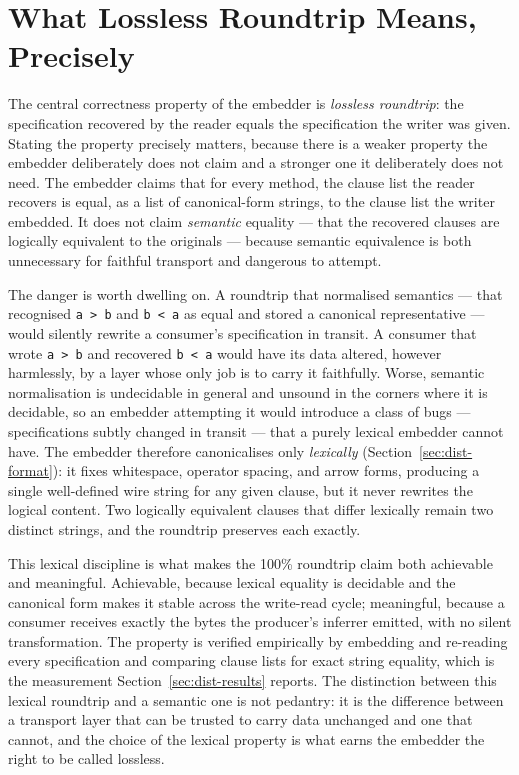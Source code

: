 \section{What Lossless Roundtrip Means, Precisely}
\label{sec:dist-lossless}

The central correctness property of the embedder is \emph{lossless roundtrip}:
the specification recovered by the reader equals the specification the writer was
given. Stating the property precisely matters, because there is a weaker property
the embedder deliberately does not claim and a stronger one it deliberately does
not need. The embedder claims that for every method, the clause list the reader
recovers is equal, as a list of canonical-form strings, to the clause list the
writer embedded. It does not claim \emph{semantic} equality --- that the recovered
clauses are logically equivalent to the originals --- because semantic
equivalence is both unnecessary for faithful transport and dangerous to attempt.

The danger is worth dwelling on. A roundtrip that normalised semantics --- that
recognised \texttt{a > b} and \texttt{b < a} as equal and stored a canonical
representative --- would silently rewrite a consumer's specification in transit.
A consumer that wrote \texttt{a > b} and recovered \texttt{b < a} would have its
data altered, however harmlessly, by a layer whose only job is to carry it
faithfully. Worse, semantic normalisation is undecidable in general and unsound in
the corners where it is decidable, so an embedder attempting it would introduce a
class of bugs --- specifications subtly changed in transit --- that a purely
lexical embedder cannot have. The embedder therefore canonicalises only
\emph{lexically} (Section~\ref{sec:dist-format}): it fixes whitespace, operator
spacing, and arrow forms, producing a single well-defined wire string for any
given clause, but it never rewrites the logical content. Two logically equivalent
clauses that differ lexically remain two distinct strings, and the roundtrip
preserves each exactly.

This lexical discipline is what makes the 100\% roundtrip claim both achievable
and meaningful. Achievable, because lexical equality is decidable and the
canonical form makes it stable across the write-read cycle; meaningful, because a
consumer receives exactly the bytes the producer's inferrer emitted, with no
silent transformation. The property is verified empirically by embedding and
re-reading every specification and comparing clause lists for exact string
equality, which is the measurement Section~\ref{sec:dist-results} reports. The
distinction between this lexical roundtrip and a semantic one is not pedantry: it
is the difference between a transport layer that can be trusted to carry data
unchanged and one that cannot, and the choice of the lexical property is what
earns the embedder the right to be called lossless.

